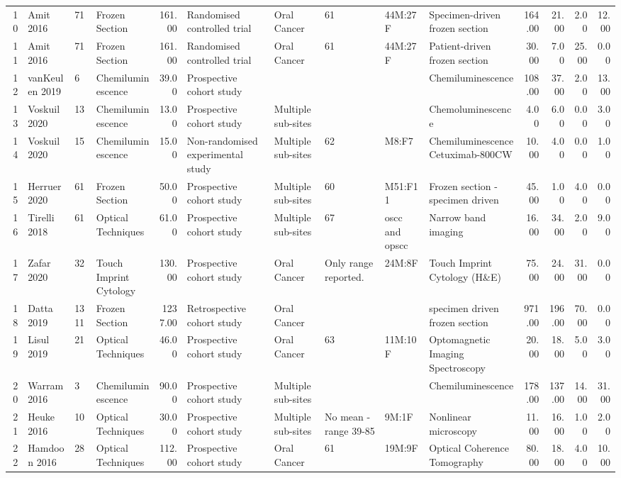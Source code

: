 \begin{table}[ht]
\begin{tabular}{rlllrlllllrrrr}
  10 & Amit 2016 & 71 & Frozen Section & 161.00 & Randomised controlled trial & Oral Cancer & 61 & 44M:27F & Specimen-driven frozen section & 164.00 & 21.00 & 2.00 & 12.00 \\ 
  11 & Amit 2016 & 71 & Frozen Section & 161.00 & Randomised controlled trial & Oral Cancer & 61 & 44M:27F & Patient-driven frozen section & 30.00 & 7.00 & 25.00 & 0.00 \\ 
  12 & vanKeulen 2019 & 6 & Chemiluminescence & 39.00 & Prospective cohort study &  &  &  & Chemiluminescence & 108.00 & 37.00 & 2.00 & 13.00 \\ 
  13 & Voskuil 2020 & 13 & Chemiluminescence & 13.00 & Prospective cohort study & Multiple sub-sites &  &  & Chemoluminescence & 4.00 & 6.00 & 0.00 & 3.00 \\ 
  14 & Voskuil 2020 & 15 & Chemiluminescence & 15.00 & Non-randomised experimental study & Multiple sub-sites & 62 & M8:F7 & Chemiluminescence Cetuximab-800CW & 10.00 & 4.00 & 0.00 & 1.00 \\ 
  15 & Herruer 2020 & 61 & Frozen Section & 50.00 & Prospective cohort study & Multiple sub-sites & 60 & M51:F11 & Frozen section - specimen driven & 45.00 & 1.00 & 4.00 & 0.00 \\ 
  16 & Tirelli 2018 & 61 & Optical Techniques & 61.00 & Prospective cohort study & Multiple sub-sites & 67 & oscc and opscc & Narrow band imaging & 16.00 & 34.00 & 2.00 & 9.00 \\ 
  17 & Zafar 2020 & 32 & Touch Imprint Cytology & 130.00 & Prospective cohort study & Oral Cancer & Only range reported. & 24M:8F & Touch Imprint Cytology (H\&E) & 75.00 & 24.00 & 31.00 & 0.00 \\ 
  18 & Datta 2019 & 1311 & Frozen Section & 1237.00 & Retrospective cohort study & Oral Cancer &  &  & specimen driven frozen section & 971.00 & 196.00 & 70.00 & 0.00 \\ 
  19 & Lisul 2019 & 21 & Optical Techniques & 46.00 & Prospective cohort study & Oral Cancer & 63 & 11M:10F & Optomagnetic Imaging Spectroscopy & 20.00 & 18.00 & 5.00 & 3.00 \\ 
  20 & Warram 2016 & 3 & Chemiluminescence & 90.00 & Prospective cohort study & Multiple sub-sites &  &  & Chemiluminescence & 178.00 & 137.00 & 14.00 & 31.00 \\ 
  21 & Heuke 2016 & 10 & Optical Techniques & 30.00 & Prospective cohort study & Multiple sub-sites & No mean - range 39-85 & 9M:1F & Nonlinear microscopy & 11.00 & 16.00 & 1.00 & 2.00 \\ 
  22 & Hamdoon 2016 & 28 & Optical Techniques & 112.00 & Prospective cohort study & Oral Cancer & 61 & 19M:9F & Optical Coherence Tomography & 80.00 & 18.00 & 4.00 & 10.00 \\ 

\end{tabular}
\end{table}
